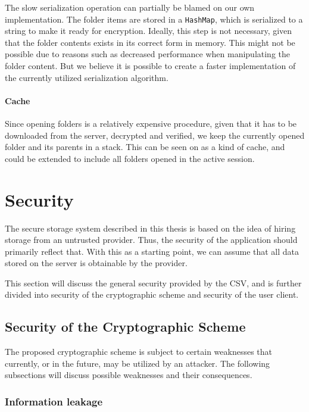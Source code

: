 \documentclass[pdftex,english,10pt,b5paper,twoside]{book}
\begin{document}
The slow serialization operation can partially be blamed on our own
implementation. The folder items are stored in a \texttt{HashMap}, which is
serialized to a string to make it ready for encryption. Ideally, this step is
not necessary, given that the folder contents exists in its correct form in
memory. This might not be possible due to reasons such as decreased performance
when manipulating the folder content. But we believe it is possible to create a
faster implementation of the currently utilized serialization algorithm.

\paragraph{Cache} Since opening folders is a relatively expensive procedure,
given that it has to be downloaded from the server, decrypted and verified, we
keep the currently opened folder and its parents in a stack. This can be seen
on as a kind of cache, and could be extended to include all folders opened
in the active session.

\section{Security}

The secure storage system described in this thesis is based on the idea of
hiring storage from an untrusted provider. Thus, the security of the
application should primarily reflect that. With this as a starting point, we
can assume that all data stored on the server is obtainable by the provider.

This section will discuss the general security provided by the \acl{CSV}, and
is further divided into security of the cryptographic scheme and security of
the user client.

\subsection{Security of the Cryptographic Scheme}

The proposed cryptographic scheme is subject to certain weaknesses that
currently, or in the future, may be utilized by an attacker. The following
subsections will discuss possible weaknesses and their consequences.

\subsubsection{Information leakage}
\end{document}
